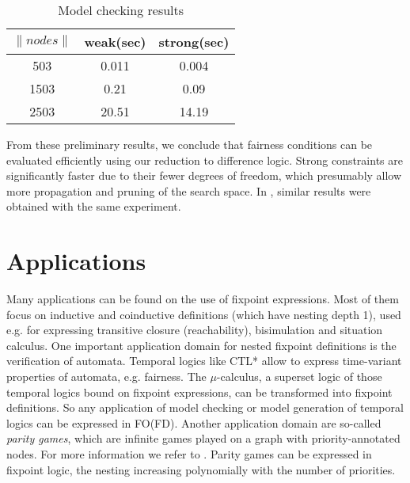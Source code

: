 \documentclass{tlp}
\begin{document}
\begin{table}
\begin{tabular}{|c|c|c|}
\hline
$\|nodes\|$ & weak(sec) & strong(sec) \\
\hline
503 & 0.011	& 0.004 \\
1503 & 0.21 & 0.09 \\
2503 & 20.51 & 14.19 \\
\hline
\end{tabular}
\caption{Model checking results} \label{fig:results}
\end{table}

From these preliminary results, we conclude that fairness conditions can be evaluated efficiently using our reduction to difference logic. Strong constraints are significantly faster due to their fewer degrees of freedom, which presumably allow more propagation and pruning of the search space. In \cite{wlp/KeinanenN04}, similar results were obtained with the same experiment.

\section{Applications}\label{sec:app}
Many applications can be found on the use of fixpoint expressions. Most of them focus on inductive and coinductive definitions (which have nesting depth 1), used e.g. for expressing transitive closure (reachability), bisimulation and situation calculus. One important application domain for nested fixpoint definitions is the verification of automata. Temporal logics like CTL* allow to express time-variant properties of automata, e.g. fairness. The $\mu$-calculus, a superset logic of those temporal logics bound on fixpoint expressions, can be transformed into fixpoint definitions. So any application of model checking or model generation of temporal logics can be expressed in FO(FD). Another application domain are so-called \emph{parity games}, which are infinite games played on a graph with priority-annotated nodes. For more information we refer to \cite{atva/FriedmannL09}. Parity games can be expressed in fixpoint logic, the nesting increasing polynomially with the number of priorities.
\end{document}
